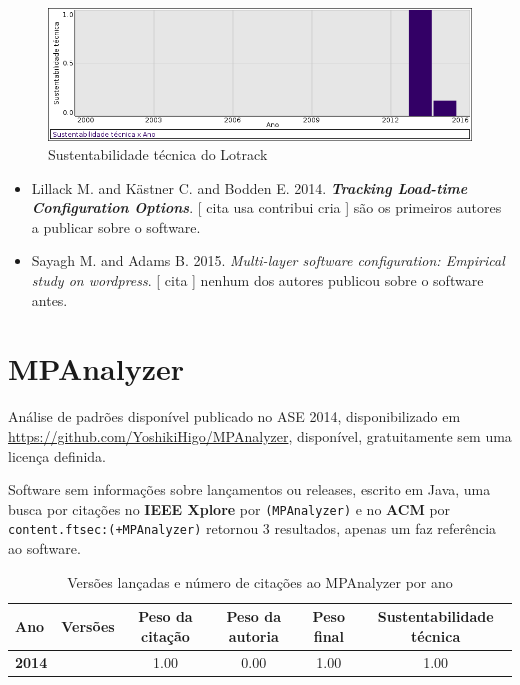 \begin{figure}[h]
  \center
  \includegraphics[scale=0.50]{imagens/softwares-charts/lotrack.png}
  \caption{Sustentabilidade técnica do Lotrack}
\end{figure}


\begin{itemize}
\item Lillack M. and K\"{a}stner C. and Bodden E.
      2014.
        \textbf{\textit{ Tracking Load-time Configuration Options}}.
      [
          cita
          usa
          contribui
          cria
      ]
são os primeiros autores a publicar sobre o software.
\item Sayagh M. and Adams B.
      2015.
        \textit{ Multi-layer software configuration: Empirical study on wordpress}.
      [
          cita
      ]
nenhum dos autores publicou sobre o software antes.
\end{itemize}
\section{MPAnalyzer}

Análise de padrões disponível
publicado no ASE 2014,
disponibilizado em \url{https://github.com/YoshikiHigo/MPAnalyzer},
disponível,
gratuitamente
sem uma licença definida.

Software sem informações sobre lançamentos ou releases,
escrito em Java,
uma busca por citações no {\bf IEEE Xplore} por
\texttt{(MPAnalyzer)}
e no {\bf ACM} por
\texttt{content.ftsec:(+MPAnalyzer)}
retornou
3 resultados,
apenas um faz referência ao software.


\begin{table}[H]
\caption{Versões lançadas e número de citações ao MPAnalyzer por ano}
\centering
\begin{tabular}{| l | c | c | c | c | c |}
  \hline
  Ano & Versões & Peso da citação & Peso da autoria & Peso final & Sustentabilidade técnica \\
  \hline
            {\bf 2014}
          &
          
          &
          1.00
          &
          0.00
          &
          1.00
          &
            {\color{blue} 1.00}
          \\
\hline
\end{tabular}
\end{table}

